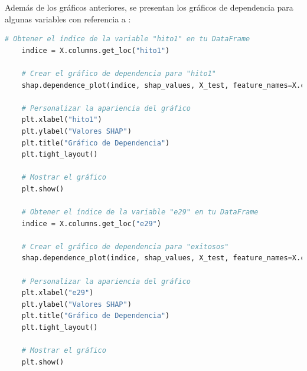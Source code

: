 Además de los gráficos anteriores, se presentan los gráficos de dependencia para algunas variables con referencia a :

\begin{lstlisting}[language=Python, caption=Grafico de dependencia hito1  e29, label=lst:grafDepHito1e29]
    # Obtener el índice de la variable "hito1" en tu DataFrame
    indice = X.columns.get_loc("hito1")
    
    # Crear el gráfico de dependencia para "hito1"
    shap.dependence_plot(indice, shap_values, X_test, feature_names=X.columns, show=False)
    
    # Personalizar la apariencia del gráfico
    plt.xlabel("hito1")
    plt.ylabel("Valores SHAP")
    plt.title("Gráfico de Dependencia")
    plt.tight_layout()
    
    # Mostrar el gráfico
    plt.show()

    # Obtener el índice de la variable "e29" en tu DataFrame
    indice = X.columns.get_loc("e29")

    # Crear el gráfico de dependencia para "exitosos"
    shap.dependence_plot(indice, shap_values, X_test, feature_names=X.columns, show=False)

    # Personalizar la apariencia del gráfico
    plt.xlabel("e29")
    plt.ylabel("Valores SHAP")
    plt.title("Gráfico de Dependencia")
    plt.tight_layout()

    # Mostrar el gráfico
    plt.show()
\end{lstlisting}

